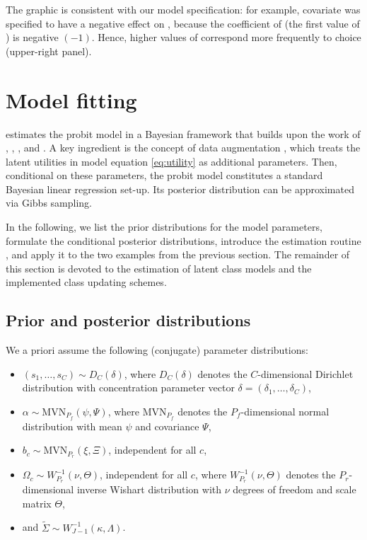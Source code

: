 \documentclass[article,shortnames]{jss}
\newcommand{\fct}[1]{\code{#1()}}
\begin{document}
The graphic is consistent with our model specification: for example, covariate  was specified to have a negative effect on , because the coefficient of  (the first value of ) is negative $(-1)$. Hence, higher values of  correspond more frequently to choice  (upper-right panel).

\section{Model fitting} \label{sec:model_fitting}

 estimates the probit model in a Bayesian framework that builds upon the work of \cite{McCulloch:1994}, \cite{Nobile:1998}, \cite{Allenby:1998}, and \cite{Imai:2005}. A key ingredient is the concept of data augmentation \citep{Albert:1993}, which treats the latent utilities in model equation \eqref{eq:utility} as additional parameters. Then, conditional on these parameters, the probit model constitutes a standard Bayesian linear regression set-up. Its posterior distribution can be approximated via Gibbs sampling.

In the following, we list the prior distributions for the model parameters, formulate the conditional posterior distributions, introduce the estimation routine \fct{fit\_model}, and apply it to the two examples from the previous section. The remainder of this section is devoted to the estimation of latent class models and the implemented class updating schemes.

\subsection{Prior and posterior distributions} \label{subsec:prior_and_posterior}

We a priori assume the following (conjugate) parameter distributions:
\begin{itemize}
  \item $(s_1,\dots,s_C)\sim D_C(\delta)$, where $D_C(\delta)$ denotes the $C$-dimensional Dirichlet distribution with concentration parameter vector $\delta = (\delta_1,\dots,\delta_C)$,
  \item $\alpha\sim \text{MVN}_{P_f}(\psi,\Psi)$, where $\text{MVN}_{P_f}$ denotes the $P_f$-dimensional normal distribution with mean $\psi$ and covariance $\Psi$,
  \item $b_c \sim \text{MVN}_{P_r}(\xi,\Xi)$, independent for all $c$,
  \item $\Omega_c \sim W^{-1}_{P_r}(\nu,\Theta)$, independent for all $c$, where $W^{-1}_{P_r}(\nu,\Theta)$ denotes the $P_r$-dimensional inverse Wishart distribution with $\nu$ degrees of freedom and scale matrix $\Theta$,
  \item and $\tilde{\Sigma} \sim W^{-1}_{J-1}(\kappa,\Lambda)$.
\end{itemize}
\end{document}
